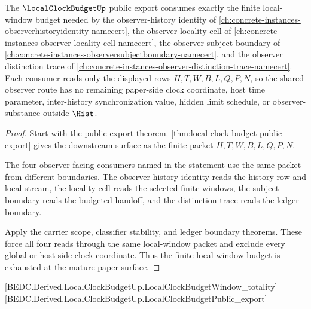 \begin{theorem}
\label{thm:local-clock-budget-mature-treatment}
The $\LocalClockBudgetUp$ public export consumes exactly the finite local-window budget needed by the observer-history identity of \autoref{ch:concrete-instances-observerhistoryidentity-namecert}, the observer locality cell of \autoref{ch:concrete-instances-observer-locality-cell-namecert}, the observer subject boundary of \autoref{ch:concrete-instances-observersubjectboundary-namecert}, and the observer distinction trace of \autoref{ch:concrete-instances-observer-distinction-trace-namecert}. Each consumer reads only the displayed rows $H,T,W,B,L,Q,P,N$, so the shared observer route has no remaining paper-side clock coordinate, host time parameter, inter-history synchronization value, hidden limit schedule, or observer-substance outside $\Hist$.
\end{theorem}
\begin{proof}
Start with the public export theorem. \autoref{thm:local-clock-budget-public-export} gives the downstream surface as the finite packet $H,T,W,B,L,Q,P,N$.

The four observer-facing consumers named in the statement use the same packet from different boundaries. The observer-history identity reads the history row and local stream, the locality cell reads the selected finite windows, the subject boundary reads the budgeted handoff, and the distinction trace reads the ledger boundary.

Apply the carrier scope, classifier stability, and ledger boundary theorems. These force all four reads through the same local-window packet and exclude every global or host-side clock coordinate. Thus the finite local-window budget is exhausted at the mature paper surface.
\end{proof}

[BEDC.Derived.LocalClockBudgetUp.LocalClockBudgetWindow\_totality]
[BEDC.Derived.LocalClockBudgetUp.LocalClockBudgetPublic\_export]


